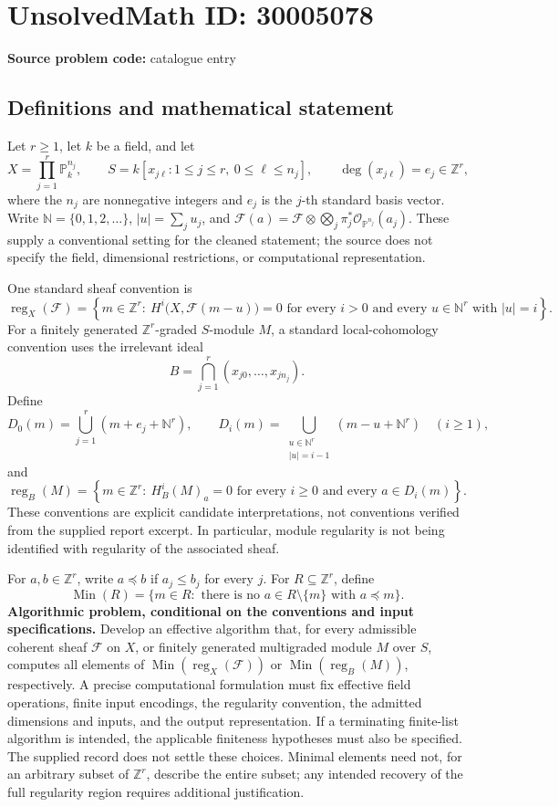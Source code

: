\documentclass[11pt]{article}
\newcommand{\N}{\mathbb{N}}
\newcommand{\Z}{\mathbb{Z}}
\newcommand{\PP}{\mathbb{P}}
\begin{document}
\section*{UnsolvedMath ID: 30005078}
\textbf{Source problem code:} catalogue entry
\subsection{Definitions and mathematical statement}
Let \(r\geq 1\), let \(k\) be a field, and let
\[
X=\prod_{j=1}^{r}\PP_k^{n_j},\qquad S=k[x_{j\ell}:1\leq j\leq r,\ 0\leq\ell\leq n_j],\qquad \deg(x_{j\ell})=e_j\in\Z^r,
\]
where the \(n_j\) are nonnegative integers and \(e_j\) is the \(j\)-th standard basis vector. Write \(\N=\{0,1,2,\ldots\}\), \(|u|=\sum_j u_j\), and \(\mathcal F(a)=\mathcal F\otimes\bigotimes_j\pi_j^*\mathcal O_{\PP^{n_j}}(a_j)\). These supply a conventional setting for the cleaned statement; the source does not specify the field, dimensional restrictions, or computational representation.

One standard sheaf convention is
\[
\operatorname{reg}_X(\mathcal F)=\left\{m\in\Z^r:\ H^i\bigl(X,\mathcal F(m-u)\bigr)=0\text{ for every }i>0\text{ and every }u\in\N^r\text{ with }|u|=i\right\}.
\]
For a finitely generated \(\Z^r\)-graded \(S\)-module \(M\), a standard local-cohomology convention uses the irrelevant ideal
\[
B=\bigcap_{j=1}^{r}(x_{j0},\ldots,x_{jn_j}).
\]
Define
\[
D_0(m)=\bigcup_{j=1}^{r}(m+e_j+\N^r),\qquad
D_i(m)=\bigcup_{\substack{u\in\N^r\\|u|=i-1}}(m-u+\N^r)\quad(i\geq1),
\]
and
\[
\operatorname{reg}_B(M)=\left\{m\in\Z^r:\ H_B^i(M)_a=0\text{ for every }i\geq0\text{ and every }a\in D_i(m)\right\}.
\]
These conventions are explicit candidate interpretations, not conventions verified from the supplied report excerpt. In particular, module regularity is not being identified with regularity of the associated sheaf.

For \(a,b\in\Z^r\), write \(a\preceq b\) if \(a_j\leq b_j\) for every \(j\). For \(R\subseteq\Z^r\), define
\[
\operatorname{Min}(R)=\{m\in R:\text{ there is no }a\in R\setminus\{m\}\text{ with }a\preceq m\}.
\]
\textbf{Algorithmic problem, conditional on the conventions and input specifications.} Develop an effective algorithm that, for every admissible coherent sheaf \(\mathcal F\) on \(X\), or finitely generated multigraded module \(M\) over \(S\), computes all elements of \(\operatorname{Min}(\operatorname{reg}_X(\mathcal F))\) or \(\operatorname{Min}(\operatorname{reg}_B(M))\), respectively. A precise computational formulation must fix effective field operations, finite input encodings, the regularity convention, the admitted dimensions and inputs, and the output representation. If a terminating finite-list algorithm is intended, the applicable finiteness hypotheses must also be specified. The supplied record does not settle these choices. Minimal elements need not, for an arbitrary subset of \(\Z^r\), describe the entire subset; any intended recovery of the full regularity region requires additional justification.
\end{document}
